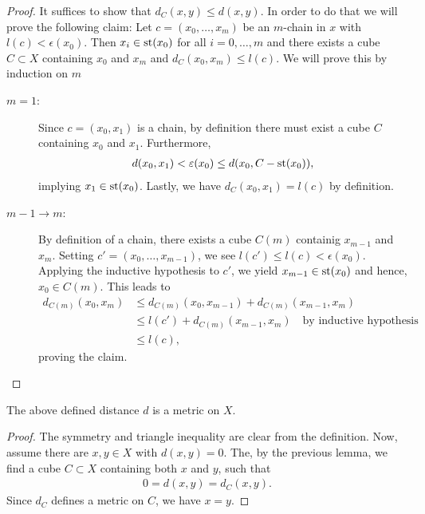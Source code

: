 \begin{proof}
  It suffices to show that \(d_C(x,y) \leq d(x,y)\). In order to do that we will prove the following claim:
  Let \(c = (x_0, \dots, x_m)\) be an \(m\)-chain in \(x\) with \(l(c) < \epsilon(x_0)\). Then \(x_i \in \operatorname{st}(x_0)\) for all \(i = 0, \dots, m\) and there exists a cube \(C \subset X\) containing \(x_0\) and \(x_m\) and \(d_C(x_0, x_m) \leq l(c)\). We will prove this by induction on \(m\)

  \begin{description}
  \item[\(m=1\):] Since \(c = (x_0, x_1)\) is a chain, by definition there must exist a cube \(C\) containing \(x_0\) and \(x_1\). Furthermore,
    \begin{align*}
      d(x_0, x_1) < \varepsilon(x_0) \leq d(x_0, C - \operatorname{st}(x_0)),
    \end{align*}
    implying \(x_1 \in \operatorname{st}(x_0)\). Lastly, we have \(d_C(x_0,x_1) = l(c)\) by definition.
  \item[\(m-1 \to m\):] By definition of a chain, there exists a cube \(C(m)\) containig \(x_{m-1}\) and \(x_m\). Setting \(c' = (x_0, \dots, x_{m-1})\), we see \(l(c') \leq l(c) < \epsilon(x_0)\). Applying the inductive hypothesis to \(c'\), we yield \(x_{m-1} \in \operatorname{st}(x_0)\) and hence, \(x_0 \in C(m)\). This leads to
    \begin{align*}
      d_{C(m)}(x_0, x_m)
      & \leq d_{C(m)}(x_0, x_{m-1}) + d_{C(m)}(x_{m-1}, x_m)\\
      & \leq l(c') + d_{C(m)}(x_{m-1}, x_m) \quad \text{by inductive hypothesis}\\
      & \leq l(c),
    \end{align*}
    proving the claim.
  \end{description}
\end{proof}

\begin{cor}
  The above defined distance \(d\) is a metric on \(X\).
\end{cor}

\begin{proof}
  The symmetry and triangle inequality are clear from the definition. Now, assume there are \(x,y\in X\) with \(d(x,y) = 0\). The, by the previous lemma, we find a cube \(C \subset X\) containing both \(x\) and \(y\), such that
  \begin{align*}
    0 = d(x,y) = d_C(x,y).
  \end{align*}
  Since \(d_C\) defines a metric on \(C\), we have \(x = y\).
\end{proof}

